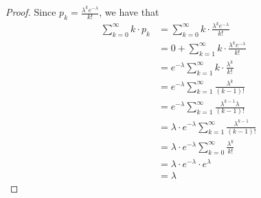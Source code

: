 \documentclass[11pt]{article}
\newcommand{\1}{\mathbbm{1}}
\begin{document}
\begin{enumerate}
\begin{proof}
    Since \(p_k=\frac{\lambda^{k} e^{-\lambda}}{k!}\), we have that
    \begin{align*}
        \sum_{k=0}^\infty k\cdot p_k &= \sum_{k=0}^{\infty}k\cdot \frac{\lambda^ke^{-\lambda}}{k!}\\
        &= 0 + \sum_{k=1}^{\infty}k\cdot \frac{\lambda^ke^{-\lambda}}{k!}\\
        &= e^{-\lambda}\sum_{k=1}^{\infty}k\cdot\frac{\lambda^k}{k!}\\
        &= e^{-\lambda}\sum_{k=1}^{\infty}\frac{\lambda^k}{(k-1)!}\\
        &= e^{-\lambda}\sum_{k=1}^{\infty}\frac{\lambda^{k-1}\lambda}{(k-1)!}\\
        &= \lambda\cdot e^{-\lambda}\sum_{k=1}^{\infty}\frac{\lambda^{k-1}}{(k-1)!}\\
        &= \lambda\cdot e^{-\lambda}\sum_{k=0}^{\infty}\frac{\lambda^{k}}{k!}\\
        &= \lambda\cdot e^{-\lambda}\cdot e^\lambda\\
        &= \lambda
    \end{align*}
\end{proof}

\end{enumerate}


\newpage
\end{document}

